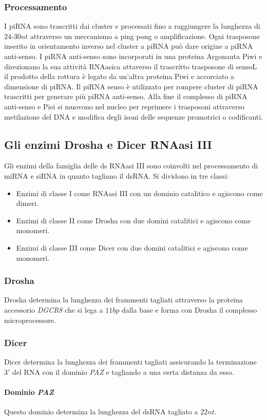 \subsubsection{Processamento}
I piRNA sono trascritti dai cluster e processati fino a raggiungere la lunghezza di $24$-$30nt$ attraverso un meccanismo a ping pong o amplificazione. Ogni trasposone inserito in
orientamento inverso nel cluster a piRNA pu\`o dare origine a piRNA anti-senso. I piRNA anti-senso sono incorporati in una proteina Argonauta Piwi e direzionano la sua attivit\`a
RNAasica attaverso il trascritto trasposone di sensoL il prodotto della rottura \`e legato da un'altra proteina Piwi e accorciato a dimensione di piRNA. Il piRNA senso \`e utilizzato
per rompere cluster di piRNA trascritti per generare pi\`u piRNA anti-senso. Alla fine il complesso di piRNA anti-senso e Piei si muovono nel nucleo per reprimere i trasposoni
attraverso metilazione del DNA e modifica degli isoni delle sequenze promotrici o codificanti. 
\subsection{Gli enzimi Drosha e Dicer RNAasi III}
Gli enzimi della famiglia delle ds RNAasi III sono coinvolti nel processamento di miRNA e siRNA in quanto tagliano il dsRNA. Si dividono in tre classi:
\begin{itemize}
	\item Enzimi di classe I come RNAasi III con un dominio catalitico e agiscono come dimeri.
	\item Enzimi di classe II come Drosha con due domini catalitici e agiscono come monomeri.
	\item Enzimi di classe III come Dicer con due domini catalitici e agiscono come monomeri.
\end{itemize}
\subsubsection{Drosha}
Drosha determina la lunghezza dei frammenti tagliati attraverso la proteina accessorio \emph{DGCR8} che si lega a $11bp$ dalla base e forma con Drosha il complesso microprocessore.
\subsubsection{Dicer}
Dicer determina la lunghezza dei frammenti tagliati assicurando la terminazione $3'$ del RNA con il dominio \emph{PAZ} e tagliando a una certa distanza da esso. 
\paragraph{Dominio \emph{PAZ}} 
Questo dominio determina la lunghezza del dsRNA tagliato a $22nt$. 
